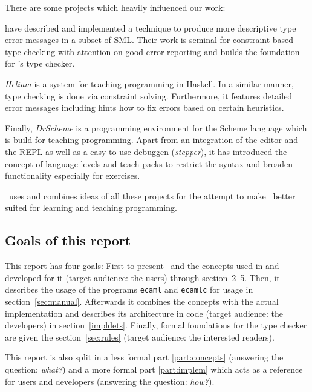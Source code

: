 There are some projects which heavily influenced our work:

\citet{haackwells04} have described and implemented a technique 
to produce more descriptive type error messages in a subset of SML.  
Their work is seminal for constraint based type checking with attention 
on good error reporting and builds the foundation for \easyocaml's type 
checker.

\emph{Helium} \citep{helium-hw03} is a system for teaching programming 
in Haskell. In a similar manner, type checking is done via constraint 
solving. Furthermore, it features detailed error messages including 
hints how to fix errors based on certain heuristics.

Finally, \emph{DrScheme} \citep{Felleisen98thedrscheme} is a programming 
environment for the Scheme language which is build for teaching 
programming.  Apart from an integration of the editor and the REPL as well as a
easy to use debuggen (\emph{stepper}), it has introduced the concept of language
levels and teach packs to restrict the syntax and broaden functionality
especially for exercises.

\easyocaml\ uses and combines ideas of all these projects for the attempt to
make \ocaml\ better suited for learning and teaching programming. \more


\subsection*{Goals of this report}

This report has four goals:
First to present \easyocaml\ and the concepts used in and developed for it
(target audience: the users) through section~2--5.
Then, it describes the usage of the programs \texttt{ecaml} and \texttt{ecamlc}
for usage in section~\ref{sec:manual}.
Afterwards it combines the concepts with the actual implementation and
describes its architecture in code (target audience: the developers) in
section~\ref{impldets}.
Finally, formal foundations for the type checker are given the section~\ref{sec:rules} (target
audience: the interested readers).

This report is also split in a less formal part \ref{part:concepts} (answering
the question: \emph{what?}) and a more formal part \ref{part:implem}
which acts as a reference for users and developers (answering the question:
\emph{how?}).
